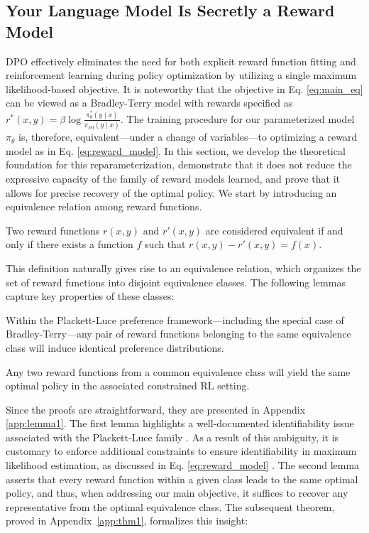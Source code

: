 \label{sec:theory}

\subsection{Your Language Model Is Secretly a Reward Model} DPO effectively eliminates the need for both explicit reward function fitting and reinforcement learning during policy optimization by utilizing a single maximum likelihood-based objective. It is noteworthy that the objective in Eq. \ref{eq:main_eq} can be viewed as a Bradley-Terry model with rewards specified as $r^*(x, y) = \beta \log\frac{\pi^*_\theta(y \mid x)}{\pi_\text{ref}(y \mid x)}$. The training procedure for our parameterized model $\pi_{\theta}$ is, therefore, equivalent—under a change of variables—to optimizing a reward model as in Eq. \ref{eq:reward_model}. In this section, we develop the theoretical foundation for this reparameterization, demonstrate that it does not reduce the expressive capacity of the family of reward models learned, and prove that it allows for precise recovery of the optimal policy. We start by introducing an equivalence relation among reward functions.

\begin{definition}
Two reward functions $r(x, y)$ and $r'(x, y)$ are considered equivalent if and only if there exists a function $f$ such that ${r(x, y)-r'(x, y) = f(x)}$.
\end{definition}

This definition naturally gives rise to an equivalence relation, which organizes the set of reward functions into disjoint equivalence classes. The following lemmas capture key properties of these classes:

\begin{lemma}\label{lemma:same_prefrence}
Within the Plackett-Luce preference framework—including the special case of Bradley-Terry—any pair of reward functions belonging to the same equivalence class will induce identical preference distributions.
\end{lemma}

\begin{lemma}\label{lemma:same_policy}
    Any two reward functions from a common equivalence class will yield the same optimal policy in the associated constrained RL setting.
\end{lemma}

Since the proofs are straightforward, they are presented in Appendix \ref{app:lemma1}. The first lemma highlights a well-documented identifiability issue associated with the Plackett-Luce family \cite{plackett1975analysis}. As a result of this ambiguity, it is customary to enforce additional constraints to ensure identifiability in maximum likelihood estimation, as discussed in Eq. \ref{eq:reward_model} \cite{bong2022generalized}. The second lemma asserts that every reward function within a given class leads to the same optimal policy, and thus, when addressing our main objective, it suffices to recover any representative from the optimal equivalence class. The subsequent theorem, proved in Appendix~\ref{app:thm1}, formalizes this insight:

